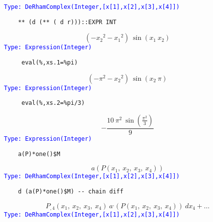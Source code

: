 \documentclass[12pt,a4paper]{article}
\newcommand{\type}[1]{\textcolor{blue}{\tt\tiny #1}}
\begin{document}
\type{Type: DeRhamComplex(Integer,[x[1],x[2],x[3],x[4]])}
\begin{lstlisting}
    ** (d (** ( d r)))::EXPR INT
\end{lstlisting}
\begin{displaymath}
    {\left( -{{{x _ {2}}} ^ {2}} -{{{x _ {1}}} ^ {2}} 
    \right)}\  {\sin \left({{{x _ {1}} \  {x _ {2}}}} \right)}
\end{displaymath}
\type{Type: Expression(Integer)}
\begin{lstlisting}
     eval(%,xs.1=%pi)
\end{lstlisting}
\begin{displaymath}
    {\left( -{{\pi} ^ {2}} -{{{x _ {2}}} ^ {2}} 
    \right)}\  {\sin \left({{{x _ {2}} \  \pi}}\right)}
\end{displaymath}
\type{Type: Expression(Integer)}
\begin{lstlisting}
     eval(%,xs.2=%pi/3)
\end{lstlisting}
\begin{displaymath}
     -\frac{{10} \  {{\pi} ^ {2}} \  {\sin \left(
     {{\frac{{\pi} ^ {2}}{3}}} \right)}}{9} 
\end{displaymath}
\type{Type: Expression(Integer)}
\begin{lstlisting}
    a(P)*one()$M
\end{lstlisting}
\begin{displaymath}
     a \left({{P \left(
    {{x _ {1}}, \: {x _ {2}}, \: {x _ {3}}, \: {x _ {4}}} 
    \right)}}\right)
\end{displaymath}
\type{Type: DeRhamComplex(Integer,[x[1],x[2],x[3],x[4]])}
\begin{lstlisting}
    d (a(P)*one()$M) -- chain diff
\end{lstlisting}
\begin{displaymath}
    {{{P _ {{,4}}} \left(
    {{x _ {1}}, \: {x _ {2}}, \: {x _ {3}}, \: {x _ {4}}} 
    \right)}\  {{a _ {{\ }} ^ {,}} \left(
    {{P \left(
    {{x _ {1}}, \: {x _ {2}}, \: {x _ {3}}, \: {x _ {4}}} 
    \right)}}
    \right)}\  {dx _ {4}}}+ \ldots 
\end{displaymath}
\type{Type: DeRhamComplex(Integer,[x[1],x[2],x[3],x[4]])}
%
% 
\end{document}
